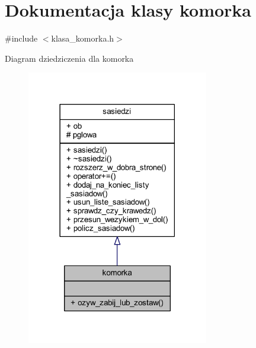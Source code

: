 \hypertarget{classkomorka}{}\section{Dokumentacja klasy komorka}
\label{classkomorka}


{\ttfamily \#include $<$klasa\+\_\+komorka.\+h$>$}



Diagram dziedziczenia dla komorka
\nopagebreak
\begin{figure}[H]
\begin{center}
\leavevmode
\includegraphics[width=225pt]{classkomorka__inherit__graph}
\end{center}
\end{figure}


